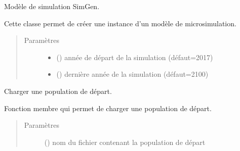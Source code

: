 \documentclass[letterpaper,10pt,french]{sphinxmanual}
\begin{document}
\begin{fulllineitems}
Modèle de simulation SimGen.

Cette classe permet de créer une instance d’un modèle de microsimulation.
\begin{quote}\begin{description}
\item[{Paramètres}] \leavevmode\begin{itemize}
\item {} 
 () \textendash{} année de départ de la simulation (défaut=2017)

\item {} 
 () \textendash{} dernière année de la simulation (défaut=2100)

\end{itemize}

\end{description}\end{quote}

\begin{fulllineitems}
\label{\detokenize{utilisation:simgen.model.startpop}}
Charger une population de départ.

Fonction membre qui permet de charger une population de départ.
\begin{quote}\begin{description}
\item[{Paramètres}] \leavevmode
{} () \textendash{} nom du fichier contenant la population de départ

\end{description}\end{quote}

\end{fulllineitems}


\end{fulllineitems}


\begin{DUlineblock}{0em}
\item[] 
\end{DUlineblock}
\end{document}
